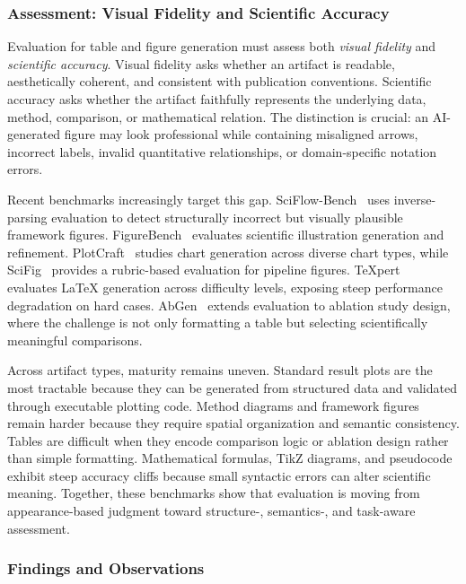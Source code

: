 \documentclass{llmxive}
\providecommand{\levelbadge}[2]{  \tcbox[on line, nobeforeafter, tcbox raise base,
         boxsep=0pt, left=2pt, right=2pt, top=0.5pt, bottom=0.5pt,
         arc=1.5pt, boxrule=0.3pt,
         colback=#1!15, colframe=#1!70]    {\scriptsize\bfseries\sffamily#2}}
\providecommand{\Sfour}{\texorpdfstring{\levelbadge{S4color}{S4}}{S4}\xspace}
\begin{document}
\subsubsection{Assessment: Visual Fidelity and Scientific Accuracy}
\label{sec:s4_eval}

Evaluation for table and figure generation must assess both \emph{visual fidelity} and \emph{scientific accuracy}. Visual fidelity asks whether an artifact is readable, aesthetically coherent, and consistent with publication conventions. Scientific accuracy asks whether the artifact faithfully represents the underlying data, method, comparison, or mathematical relation. The distinction is crucial: an AI-generated figure may look professional while containing misaligned arrows, incorrect labels, invalid quantitative relationships, or domain-specific notation errors.

Recent benchmarks increasingly target this gap. SciFlow-Bench~\cite{scifigbench2026} uses inverse-parsing evaluation to detect structurally incorrect but visually plausible framework figures. FigureBench~\cite{autofigure2026iclr} evaluates scientific illustration generation and refinement. PlotCraft~\cite{plotcraft2025} studies chart generation across diverse chart types, while SciFig~\cite{scifig2026} provides a rubric-based evaluation for pipeline figures. TeXpert~\cite{texpert2025} evaluates LaTeX generation across difficulty levels, exposing steep performance degradation on hard cases. AbGen~\cite{abgen2025} extends evaluation to ablation study design, where the challenge is not only formatting a table but selecting scientifically meaningful comparisons.

Across artifact types, maturity remains uneven. Standard result plots are the most tractable because they can be generated from structured data and validated through executable plotting code. Method diagrams and framework figures remain harder because they require spatial organization and semantic consistency. Tables are difficult when they encode comparison logic or ablation design rather than simple formatting. Mathematical formulas, TikZ diagrams, and pseudocode exhibit steep accuracy cliffs because small syntactic errors can alter scientific meaning. Together, these benchmarks show that \Sfour evaluation is moving from appearance-based judgment toward structure-, semantics-, and task-aware assessment.



\subsubsection{Findings and Observations}
\label{sec:s4_findings}
\end{document}
